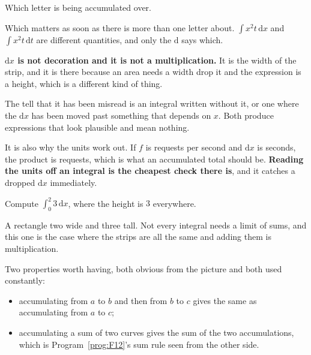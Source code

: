 \begin{fr}
\begin{ansblock}
Which letter is being accumulated over.
\end{ansblock}

Which matters as soon as there is more than one letter about.
$\int x^{2}t\,\mathrm{d}x$ and $\int x^{2}t\,\mathrm{d}t$ are different
quantities, and only the $\mathrm{d}$ says which.

\begin{trapbox}
\textbf{$\mathrm{d}x$ is not decoration and it is not a multiplication.} It is
the width of the strip, and it is there because an area needs a width \dash{}
drop it and the expression is a height, which is a different kind of thing.

The tell that it has been misread is an integral written without it, or one
where the $\mathrm{d}x$ has been moved past something that depends on $x$.
Both produce expressions that look plausible and mean nothing.

It is also why the units work out. If $f$ is requests per second and
$\mathrm{d}x$ is seconds, the product is requests, which is what an
accumulated total should be. \textbf{Reading the units off an integral is the
cheapest check there is}, and it catches a dropped $\mathrm{d}x$ immediately.
\end{trapbox}

Compute $\int_{0}^{2} 3\,\mathrm{d}x$, where the height is $3$ everywhere.
\nextframe
\end{fr}

\begin{fr}
A rectangle two wide and three tall. Not every integral needs a limit of sums,
and this one is the case where the strips are all the same and adding them is
multiplication.

Two properties worth having, both obvious from the picture and both used
constantly:

\begin{itemize}
\item accumulating from $a$ to $b$ and then from $b$ to $c$ gives the same as
  accumulating from $a$ to $c$;
\item accumulating a sum of two curves gives the sum of the two accumulations,
  which is Program~\ref{prog:F12}'s sum rule seen from the other side.
\end{itemize}
\end{fr}

